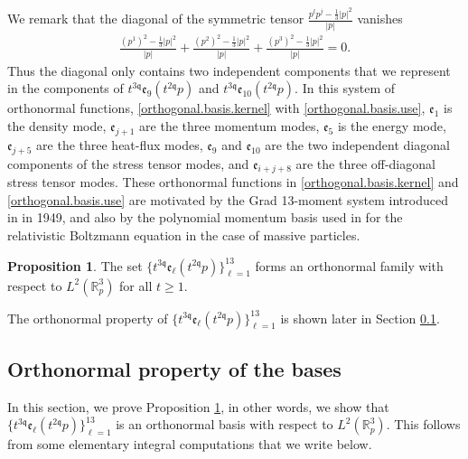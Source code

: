 \documentclass[reqno]{amsart}
\newcommand{\pv}{p}
\def\R{\mathbb R}
\newcommand{\qq}{\mathfrak{q}}
\newcommand{\tqq}{t^{2\qq}}
\newcommand{\tTq}{t^{3\qq}}
\theoremstyle{definition}
\newtheorem{proposition}[theorem]{Proposition}
\numberwithin{equation}{section}
\numberwithin{theorem}{section}
\begin{document}
We remark that the diagonal of the symmetric tensor $\frac{ \pv^l \pv^{j}-\frac{1}{3} |p|^2}{|p|}$ vanishes
\begin{align*}
    \frac{(p^1)^2-\frac13|p|^2}{{|\pv|}}+\frac{(p^2)^2-\frac13|p|^2}{{|\pv|}}+\frac{(p^3)^2-\frac13|p|^2}{{|\pv|}}=0.
\end{align*}
Thus the diagonal only contains two independent components that we represent in the components of  $\tTq \mathfrak{e}_{9}(\tqq \pv)$ and $\tTq \mathfrak{e}_{10}(\tqq \pv)$.  In this system of orthonormal functions, \eqref{orthogonal.basis.kernel} with \eqref{orthogonal.basis.use}, $\mathfrak{e}_{1}$ is the density mode, $\mathfrak{e}_{j+1}$ are the three momentum modes, $\mathfrak{e}_{5}$ is the energy mode, $\mathfrak{e}_{j+5}$ are the three heat-flux modes, $\mathfrak{e}_{9}$ and $\mathfrak{e}_{10}$ are the two independent diagonal components of the stress tensor modes,
and $\mathfrak{e}_{i+j+8}$ are the three off-diagonal stress tensor modes.  These orthonormal functions in \eqref{orthogonal.basis.kernel} and \eqref{orthogonal.basis.use} are motivated by the Grad 13-moment system introduced in \cite{Grad1949} in 1949, and also by the polynomial momentum basis used in \cite{MR2911100, RelBolNoncut2020} for the relativistic Boltzmann equation in the case of massive particles.


\begin{proposition}\label{proporthobasis}
    The set $\{\tTq \mathfrak{e}_{\ell}(\tqq \pv)\}_{\ell=1}^{13}$ forms an orthonormal family with respect to \(L^2(\R_p^3)\) for all \(t\geq 1\).
\end{proposition}

The orthonormal property of $\{\tTq \mathfrak{e}_{\ell}(\tqq \pv)\}_{\ell=1}^{13}$ is shown later in Section \ref{orthogonal.vectors.sec}.


\subsection{Orthonormal property of the bases}\label{orthogonal.vectors.sec} 

In this section, we prove Proposition \ref{proporthobasis}, in other words, we show that $\{\tTq \mathfrak{e}_{\ell}(\tqq \pv)\}_{\ell=1}^{13}$ is an orthonormal basis with respect to \(L^2(\R_p^3)\). This follows from some elementary integral computations that we write below.
\end{document}
